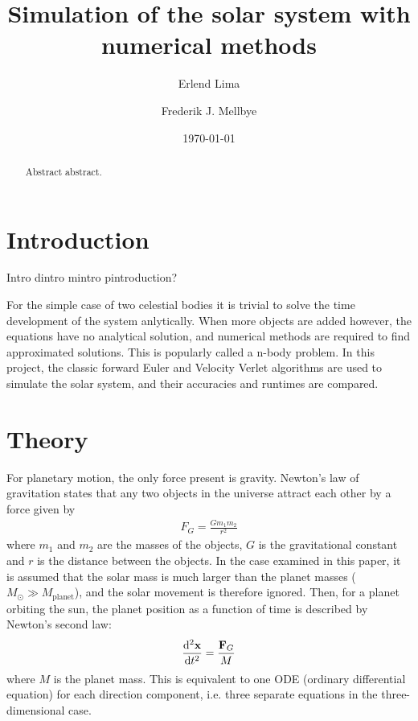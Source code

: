 \documentclass[aps,reprint]{revtex4-1}
\begin{document}
\title{Simulation of the solar system with numerical methods}
\author{Erlend Lima}
\author{Frederik J. Mellbye}
\date{\today}

\begin{abstract}
Abstract abstract.
\end{abstract}
\maketitle
\tableofcontents
\makeatletter
\let\toc@pre\relax
\let\toc@post\relax
\makeatother

\newpage

\section{Introduction}
\label{sec:introduction}
Intro dintro mintro pintroduction?

For the simple case of two celestial bodies it is trivial to solve the time
development of the system anlytically. When more objects are added however, the equations
have no analytical solution, and numerical methods are required to find
approximated solutions. This is popularly called a n-body problem. In this project, the classic forward Euler and
Velocity Verlet algorithms are used to simulate the solar system, and their
accuracies and runtimes are compared.
\section{Theory}
\label{sec:theory}
For planetary motion, the only force present is gravity. Newton's law of gravitation
states that any two objects in the universe attract each other by a force given
by
\begin{align}
  F_G = \frac{G m_1 m_2}{r^2}
\end{align}
where $m_1$ and $m_2$ are the masses of the objects, $G$ is the
gravitational constant and $r$ is the distance between the objects. In the
case examined in this paper, it is assumed that the solar mass is much larger
than the planet masses ($M_\odot \gg M_\text{planet}$), and the solar
movement is therefore ignored. Then, for a planet orbiting the sun, the
planet position as a function of time is described by Newton's second law:
\begin{align*}
  \dv[2]{\mathbf{x}}{t} = \frac{\mathbf{F}_G}{M}
\end{align*}
where $M$ is the planet mass. This is equivalent to one ODE (ordinary differential
equation) for each direction component, i.e. three separate equations in the
three-dimensional case.
\end{document}
